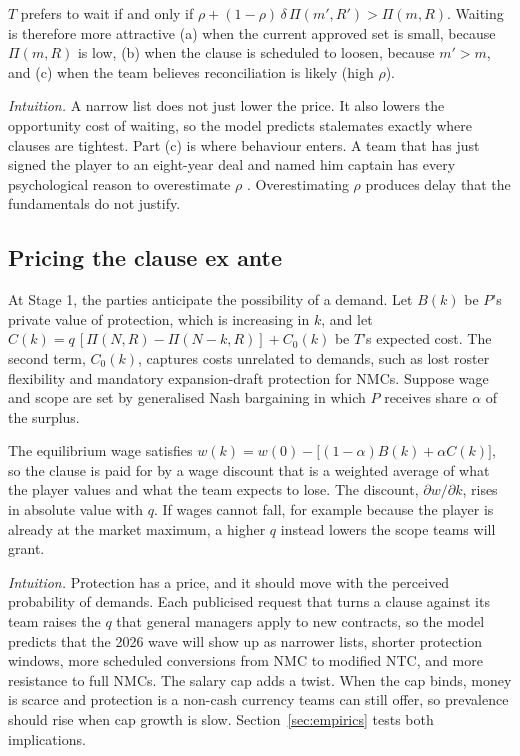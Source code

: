 \begin{proposition}[Delay]\label{prop:delay}
$T$ prefers to wait if and only if $\rho + (1-\rho)\,\delta\,\Pi(m',R') > \Pi(m,R)$. Waiting is therefore more attractive (a) when the current approved set is small, because $\Pi(m,R)$ is low, (b) when the clause is scheduled to loosen, because $m'>m$, and (c) when the team believes reconciliation is likely (high $\rho$).
\end{proposition}

\noindent\emph{Intuition.} A narrow list does not just lower the price. It also lowers the opportunity cost of waiting, so the model predicts stalemates exactly where clauses are tightest. Part (c) is where behaviour enters. A team that has just signed the player to an eight-year deal and named him captain has every psychological reason to overestimate $\rho$ \citep{arkesblumer1985,stawhoang1995}. Overestimating $\rho$ produces delay that the fundamentals do not justify.

\subsection{Pricing the clause ex ante}

At Stage 1, the parties anticipate the possibility of a demand. Let $B(k)$ be $P$'s private value of protection, which is increasing in $k$, and let $C(k)=q\,[\Pi(N,R)-\Pi(N-k,R)] + C_0(k)$ be $T$'s expected cost. The second term, $C_0(k)$, captures costs unrelated to demands, such as lost roster flexibility and mandatory expansion-draft protection for NMCs. Suppose wage and scope are set by generalised Nash bargaining in which $P$ receives share $\alpha$ of the surplus.

\begin{proposition}\label{prop:price}
The equilibrium wage satisfies $w(k)=w(0)-\big[(1-\alpha)B(k)+\alpha C(k)\big]$, so the clause is paid for by a wage discount that is a weighted average of what the player values and what the team expects to lose. The discount, $\partial w/\partial k$, rises in absolute value with $q$. If wages cannot fall, for example because the player is already at the market maximum, a higher $q$ instead lowers the scope teams will grant.
\end{proposition}

\noindent\emph{Intuition.} Protection has a price, and it should move with the perceived probability of demands. Each publicised request that turns a clause against its team raises the $q$ that general managers apply to new contracts, so the model predicts that the 2026 wave will show up as narrower lists, shorter protection windows, more scheduled conversions from NMC to modified NTC, and more resistance to full NMCs. The salary cap adds a twist. When the cap binds, money is scarce and protection is a non-cash currency teams can still offer, so prevalence should rise when cap growth is slow. Section~\ref{sec:empirics} tests both implications.


